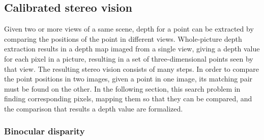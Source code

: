 \subsection{Calibrated stereo vision} %

Given two or more views of a same scene, depth for a point can be extracted by comparing the positions of the point in different views.
Whole-picture depth extraction results in a depth map imaged from a single view, giving a depth value for each pixel in a picture, resulting in a set of three-dimensional points seen by that view.
The resulting stereo vision consists of many steps.
In order to compare the point positions in two images, given a point in one image, its matching pair must be found on the other.
In the following section, this search problem in finding corresponding pixels, mapping them so that they can be compared, and the comparison that results a depth value are formalized.


\subsubsection{Binocular disparity} \label{sec:binocular} %





